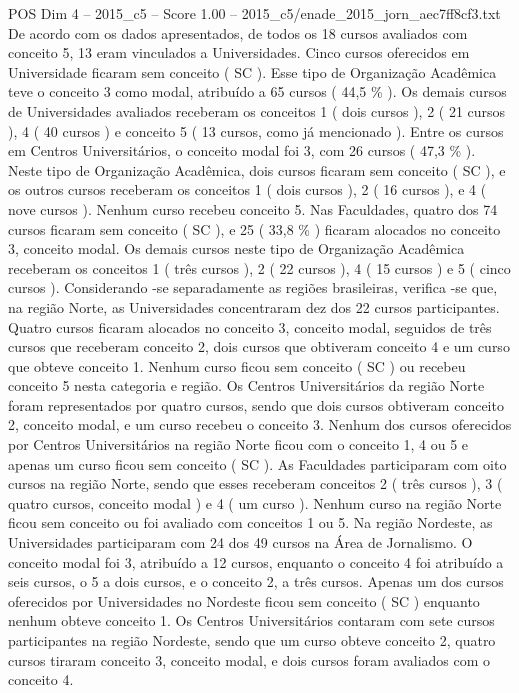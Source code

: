 \begin{textsample}{POS Dim 4 – 2015\_c5 – Score 1.00 – 2015\_c5/enade\_2015\_jorn\_aec7ff8cf3.txt}
De acordo com os dados apresentados, de todos os 18 cursos avaliados com conceito 5, 13 eram vinculados a Universidades.
Cinco cursos oferecidos em Universidade ficaram sem conceito ( SC ).
Esse tipo de Organização Acadêmica teve o conceito 3 como modal, atribuído a 65 cursos ( 44,5 \% ).
Os demais cursos de Universidades avaliados receberam os conceitos 1 ( dois cursos ), 2 ( 21 cursos ), 4 ( 40 cursos ) e conceito 5 ( 13 cursos, como já mencionado ).
Entre os cursos em Centros Universitários, o conceito modal foi 3, com 26 cursos ( 47,3 \% ).
Neste tipo de Organização Acadêmica, dois cursos ficaram sem conceito ( SC ), e os outros cursos receberam os conceitos 1 ( dois cursos ), 2 ( 16 cursos ), e 4 ( nove cursos ).
Nenhum curso recebeu conceito 5.
Nas Faculdades, quatro dos 74 cursos ficaram sem conceito ( SC ), e 25 ( 33,8 \% ) ficaram alocados no conceito 3, conceito modal.
Os demais cursos neste tipo de Organização Acadêmica receberam os conceitos 1 ( três cursos ), 2 ( 22 cursos ), 4 ( 15 cursos ) e 5 ( cinco cursos ).
Considerando -se separadamente as regiões brasileiras, verifica -se que, na região Norte, as Universidades concentraram dez dos 22 cursos participantes.
Quatro cursos ficaram alocados no conceito 3, conceito modal, seguidos de três cursos que receberam conceito 2, dois cursos que obtiveram conceito 4 e um curso que obteve conceito 1.
Nenhum curso ficou sem conceito ( SC ) ou recebeu conceito 5 nesta categoria e região.
Os Centros Universitários da região Norte foram representados por quatro cursos, sendo que dois cursos obtiveram conceito 2, conceito modal, e um curso recebeu o conceito 3.
Nenhum dos cursos oferecidos por Centros Universitários na região Norte ficou com o conceito 1, 4 ou 5 e apenas um curso ficou sem conceito ( SC ).
As Faculdades participaram com oito cursos na região Norte, sendo que esses receberam conceitos 2 ( três cursos ), 3 ( quatro cursos, conceito modal ) e 4 ( um curso ).
Nenhum curso na região Norte ficou sem conceito ou foi avaliado com conceitos 1 ou 5.
Na região Nordeste, as Universidades participaram com 24 dos 49 cursos na Área de Jornalismo.
O conceito modal foi 3, atribuído a 12 cursos, enquanto o conceito 4 foi atribuído a seis cursos, o 5 a dois cursos, e o conceito 2, a três cursos.
Apenas um dos cursos oferecidos por Universidades no Nordeste ficou sem conceito ( SC ) enquanto nenhum obteve conceito 1.
Os Centros Universitários contaram com sete cursos participantes na região Nordeste, sendo que um curso obteve conceito 2, quatro cursos tiraram conceito 3, conceito modal, e dois cursos foram avaliados com o conceito 4.

\end{textsample}
